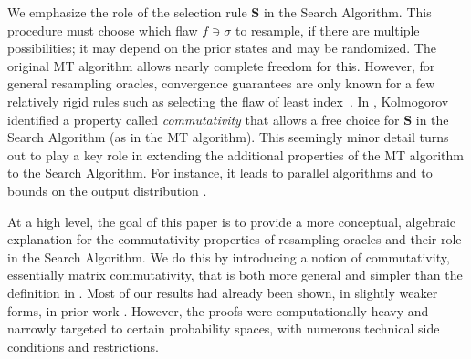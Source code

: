 \documentclass[11pt]{article}
\begin{document}
We emphasize the role of the selection rule $\mathbf S$ in the Search Algorithm. This procedure must choose which flaw $f \ni \sigma$ to resample, if there are multiple possibilities; it may depend on the prior states and may be randomized. The original MT algorithm allows nearly complete freedom for this. However, for general resampling oracles, convergence guarantees are only known for a few relatively rigid rules such as selecting the flaw of least index~\cite{HV}.  In \cite{Kolmofocs}, Kolmogorov identified a property called \emph{commutativity} that allows a free choice for $\mathbf S$ in the Search Algorithm (as in the MT algorithm). This seemingly minor detail turns out to play a key role in extending the additional properties of the MT algorithm to the Search Algorithm. For instance, it leads to parallel algorithms \cite{Kolmofocs} and to bounds on the output distribution \cite{LLLWTL}.   

At a high level, the goal of this paper is to provide a more conceptual, algebraic explanation for the commutativity properties of resampling oracles and their role in the Search Algorithm. We do this by introducing a notion of commutativity, essentially matrix commutativity, that is both more general and simpler than the definition in \cite{Kolmofocs}.  Most of our results had already been shown, in slightly weaker forms, in prior
%
work  %
\cite{Kolmofocs,LLLWTL, NewBoundsHarris}.  However, the proofs were computationally heavy and narrowly targeted to certain probability spaces,  with numerous technical side conditions and restrictions. 
  
\end{document}
